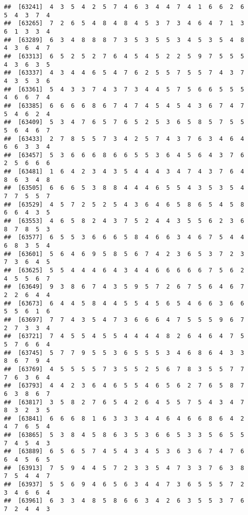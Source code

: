 \documentclass[
]{book}
\begin{document}
\begin{verbatim}
##  [63241]  4  3  5  4  2  5  7  4  6  3  4  4  7  4  1  6  6  2  6  5  4  3  7  4
##  [63265]  7  2  6  5  4  8  4  8  4  5  3  7  3  4  6  4  7  1  3  6  1  3  3  4
##  [63289]  6  3  4  8  8  8  7  3  5  3  5  5  3  4  5  3  5  4  8  4  3  6  4  7
##  [63313]  6  5  2  5  2  7  6  4  5  4  5  2  2  5  9  7  5  5  5  4  3  6  3  5
##  [63337]  4  3  4  4  6  5  4  7  6  2  5  5  7  5  5  7  4  3  7  4  3  5  3  6
##  [63361]  5  4  3  3  7  4  3  7  3  4  4  5  7  5  6  6  5  5  5  4  6  6  7  4
##  [63385]  6  6  6  6  8  6  7  4  7  4  5  4  5  4  3  6  7  4  7  5  4  6  2  4
##  [63409]  5  3  4  7  6  5  7  6  5  2  5  3  6  5  8  5  7  5  5  5  6  4  6  7
##  [63433]  2  7  8  5  5  7  3  4  2  5  7  4  3  7  6  3  4  6  4  6  6  3  3  4
##  [63457]  5  3  6  6  6  8  6  6  5  5  3  6  4  5  6  4  3  7  6  2  5  6  6  6
##  [63481]  1  6  4  2  3  4  3  5  4  4  4  3  4  7  4  3  7  6  4  8  6  3  4  8
##  [63505]  6  6  6  5  3  8  8  4  4  4  6  5  5  4  3  5  3  5  4  7  7  5  5  7
##  [63529]  4  5  7  2  5  2  5  4  3  6  4  6  5  8  6  5  4  5  8  6  6  4  3  5
##  [63553]  4  6  5  8  2  4  3  7  5  2  4  4  3  5  5  6  2  3  6  8  7  8  5  3
##  [63577]  6  5  5  3  6  6  6  5  8  4  6  6  3  4  6  7  5  4  4  6  8  3  5  4
##  [63601]  5  6  4  6  9  5  8  5  6  7  4  2  3  6  5  3  7  2  3  7  3  6  4  5
##  [63625]  5  5  4  4  4  6  4  3  4  4  6  6  6  6  6  7  5  6  2  4  5  5  6  7
##  [63649]  9  3  8  6  7  4  3  5  9  5  7  2  6  7  5  6  4  6  7  2  2  6  4  4
##  [63673]  6  4  4  5  8  4  4  5  5  4  5  6  5  4  6  6  3  6  6  5  5  6  1  6
##  [63697]  7  7  4  3  5  4  7  3  6  6  6  4  7  5  5  5  9  6  7  2  7  3  3  4
##  [63721]  7  4  5  5  4  5  5  4  4  4  4  8  2  6  4  6  4  7  5  5  7  6  6  4
##  [63745]  5  7  7  9  5  5  3  6  5  5  5  3  4  6  8  6  4  3  3  8  6  7  9  4
##  [63769]  4  5  5  5  5  7  3  5  5  2  5  6  7  8  3  5  5  7  7  7  6  3  6  4
##  [63793]  4  4  2  3  6  4  6  5  5  4  6  5  6  2  7  6  5  8  7  6  3  8  6  7
##  [63817]  3  5  8  2  7  6  5  4  2  6  4  5  5  7  5  4  3  4  7  8  3  2  3  5
##  [63841]  6  6  6  8  1  6  3  3  3  4  4  6  4  6  6  8  6  4  2  4  7  6  5  4
##  [63865]  5  3  8  4  5  8  6  3  5  3  6  6  5  3  3  5  6  5  5  7  4  5  4  3
##  [63889]  6  5  6  5  7  4  5  4  3  4  5  3  6  3  6  7  4  7  6  6  4  5  6  5
##  [63913]  7  5  9  4  4  5  7  2  3  3  5  4  7  3  3  7  6  3  8  7  5  4  4  7
##  [63937]  5  5  6  9  4  6  5  6  3  4  4  7  3  6  5  5  5  7  2  3  4  6  6  4
##  [63961]  6  3  3  4  8  5  8  6  6  3  4  2  6  3  5  5  3  7  6  7  2  4  4  3

\end{verbatim}
\end{document}

